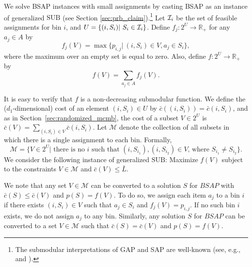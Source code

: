 \documentclass[11pt]{article}
\newcommand{\bS}{S}
\newcommand{\cI}{{\cal I}}
\newcommand{\bL}{\bar{L}}
\newcommand{\bc}{\bar{c}}
\newcommand{\mM}{\mathcal{M}}
\newcommand{\SUB}{\mbox{SUB}}
\begin{document}
{We solve BSAP instances with small assignments by casting BSAP as an instance
 of generalized $\SUB$ (see Section \ref{sec:prb_claim}).\footnote{The submodular interpretations
of GAP and SAP are well-known (see, e.g., \cite{FV06} and \cite{fgms06}).}
 Let $\cI_i$ be the set of feasible assignments for bin $i$, and $U =
\{ (i,S_i) |~ S_i \in \cI_i\}$. Define $f_j:2^U \rightarrow \mathbb{R}_+$ for any $a_j \in A$ by
$$f_j (V) = \max \{ p_{i,j} | ~(i,S_i)\in V, a_j \in S_i \},$$
where the maximum over an empty set is equal
to zero. Also, define $f:2^U \rightarrow \mathbb{R}_+$ by $$f(V) = \sum_{a_j \in A} f_j(V).$$

It is easy to verify that $f$ is a non-decreasing submodular function. We define the ($d_1$-dimensional) cost of an element  $(i,S_i) \in U$ by
$\bc((i,S_i))=\bc(i,S_i)$, and as in Section~\ref{sec:randomized_mcmb}, the cost of a subset $V\in 2^U$ is $\bc(V)= \sum_{(i,S_i) \in V }
\bc(i,S_i)$. Let $\mM$ denote the collection of all subsets in which there is a single assignment to each bin. Formally,
$$\mM = \{ V \in 2^U | \mbox{ there is no $i$ such that $(i,S_{i_1}),(i,S_{i_2}) \in V$, where $S_{i_1} \neq S_{i_2}$} \}. $$
We consider the following instance of generalized $\SUB$: Maximize $f(V)$ subject to the constraints $V\in \mM$ and $\bc(V) \leq \bL$.

We note that any set $V \in \mM$ can be converted to a solution $\bS$ for $BSAP$ with $\bc(\bS) \leq \bc(V)$ and $p(\bS) = f(V)$. To do so, we
assign each item $a_j$ to a bin $i$ if there exists $(i,S_i) \in V$
 such that $a_j\in S_i$ and $f_j(V) = p_{i,j}$. If no such bin $i$ exists, we
do not assign $a_j$ to any bin. Similarly, any solution $\bS$ for
 $BSAP$ can be converted to a set $V\in \mM$ such that  $\bc(\bS) = \bc(V)$
and $p(\bS) = f(V)$.

}
\end{document}
